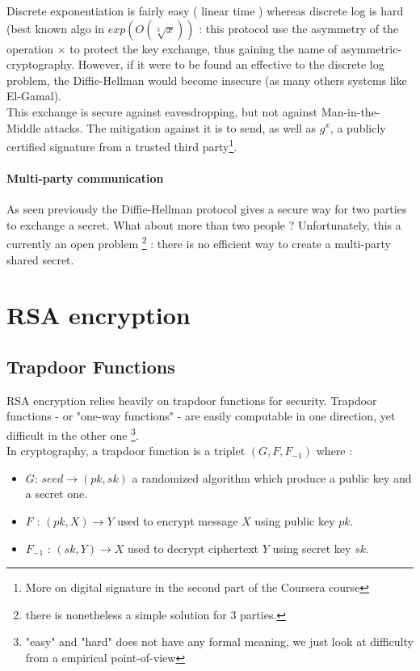 Discrete exponentiation is fairly easy ( linear time ) whereas discrete log is hard (best known algo in $exp(O(\sqrt[3]{x}))$ : this protocol use the asymmetry of the operation $\times $ to protect the key exchange, thus gaining the name of asymmetric-cryptography. However, if it were to be found an effective to the discrete log problem, the Diffie-Hellman would become insecure (as many others systems like El-Gamal).\\

This exchange is secure against eavesdropping, but not against Man-in-the-Middle attacks. The mitigation against it is to send, as well as $g^x$, a publicly certified signature from a trusted third party\footnote{More on digital signature in the second part of the Coursera course}.\\

\paragraph{Multi-party communication}
As seen previously the Diffie-Hellman protocol gives a secure way for two parties to exchange a secret. What about more than two people ? Unfortunately, this a currently an open problem \footnote{there is nonetheless a simple solution for 3 parties.} : there is no efficient way to create a multi-party shared secret.

\section{RSA encryption}


\subsection{Trapdoor Functions}

RSA encryption relies heavily on trapdoor functions for security. Trapdoor functions - or "one-way functions" - are easily computable in one direction, yet difficult in the other one \footnote{"easy" and "hard" does not have any formal meaning, we just look at difficulty from a empirical point-of-view}. \\

In cryptography, a trapdoor function is a triplet $(G, F, F_{-1})$ where :
\begin{itemize}
	\item $G$: $ seed \rightarrow (pk, sk) $ a randomized algorithm which produce a public key and a secret one.
	\item $F$ : $ (pk, X) \rightarrow  Y $ used to encrypt message $X$ using public key $pk$.
	\item $F_{-1}$ : $ (sk, Y) \rightarrow X $ used to decrypt ciphertext $Y$ using secret key $sk$.
\end{itemize}

